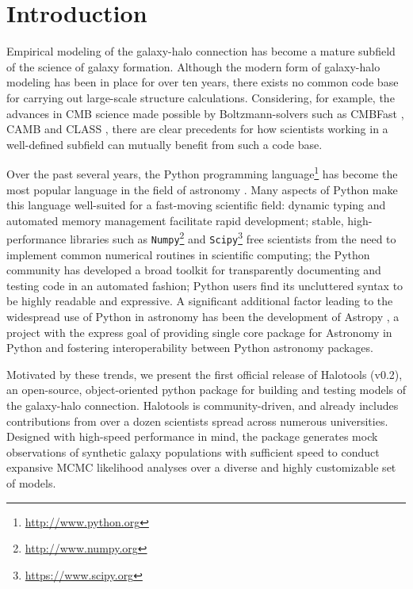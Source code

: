 \documentclass[twocolumn, tighten]{aastex6}
\begin{document}
\maketitle

\section{Introduction}
\label{section:introduction}

Empirical modeling of the galaxy-halo connection has become a mature subfield of the science of galaxy formation. Although the modern form of galaxy-halo modeling has been in place for over ten years, there exists no common code base for carrying out large-scale structure calculations. Considering, for example, the advances in CMB science made possible by Boltzmann-solvers such as CMBFast \citep{cmbfast}, CAMB \citep{camb} and CLASS \citep{class}, there are clear precedents for how scientists working in a well-defined subfield can mutually benefit from such a code base. 

Over the past several years, the Python programming language\footnote{\url{http://www.python.org}} has become the most popular language in the field of astronomy \citep{momcheva_tollerud15}. Many aspects of Python make this language well-suited for a fast-moving scientific field: dynamic typing and automated memory management facilitate rapid development; stable, high-performance libraries such as {\tt Numpy}\footnote{\url{http://www.numpy.org}}\citep{numpy_array} and {\tt Scipy}\footnote{\url{https://www.scipy.org}}\citep{scipy} free scientists from the need to implement common numerical routines in scientific computing; the Python community has developed a broad toolkit for transparently documenting and testing code in an automated fashion; Python users find its uncluttered syntax to be highly readable and expressive. A significant additional factor leading to the widespread use of Python in astronomy has been the development of  Astropy \citep{astropy}, a project with the express goal of providing single core package for Astronomy in Python and fostering interoperability between Python astronomy packages.

Motivated by these trends, we present the first official release of Halotools (v0.2), an open-source, object-oriented python package for building and testing models of the galaxy-halo connection. Halotools is community-driven, and already includes contributions from over a dozen scientists spread across numerous universities. Designed with high-speed performance in mind, the package generates mock observations of synthetic galaxy populations with sufficient speed to conduct expansive MCMC likelihood analyses over a diverse and highly customizable set of models.
\end{document}
